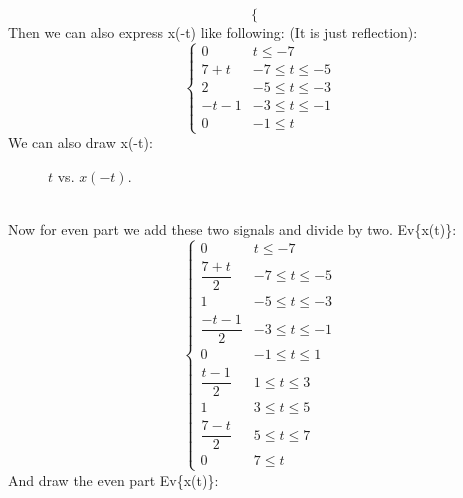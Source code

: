 \documentclass[10pt,a4paper, margin=1in]{article}
\begin{document}
\begin{enumerate}
\[\begin{cases}
   \end{cases}
\]
Then we can also express x(-t) like following: (It is just reflection): \\
\[ \begin{cases}
    0 &  t \leq -7 \\
    7+t & -7 \leq t \leq -5 \\
     2 & -5\leq t \leq -3 \\
     -t-1 & -3\leq t\leq -1 \\
      0 & -1\leq t
   \end{cases}
\]
We can also draw x(-t):
\begin{figure}[ht!]
    \centering
        \caption{$t$ vs. $x(-t)$.}
        \label{fig:q9}
    \end{figure} \\
    Now for even part we add these two signals and divide by two. Ev\{x(t)\}:
    \[ \begin{cases}
    0 &  t \leq -7 \\
    \dfrac{7+t}{2} & -7 \leq t \leq -5 \\
     1 & -5\leq t \leq -3 \\
     \dfrac{-t-1}{2} & -3\leq t\leq -1 \\
      0 & -1\leq t \leq 1 \\
      \dfrac{t-1}{2} & 1\leq t\leq 3 \\
      1 & 3\leq t \leq 5 \\
      \dfrac{7-t}{2} & 5\leq t \leq7 \\
      0 &  7 \leq t
   \end{cases}
\]
And draw the even part Ev\{x(t)\}:
\begin{figure}[ht!]
    \centering
        \begin{tikzpicture}[scale=0.90]

\end{tikzpicture}
\end{figure}
\end{enumerate}
\end{document}
